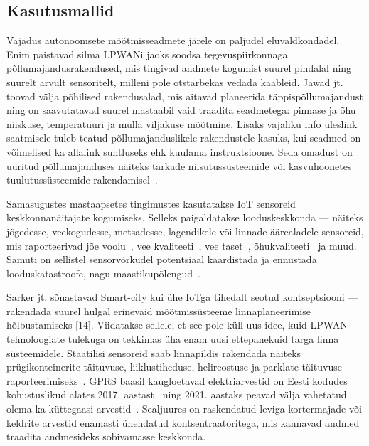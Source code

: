 \documentclass[12pt]{article}
\begin{document}
\subsection{Kasutusmallid}

Vajadus autonoomsete mõõtmisseadmete järele on paljudel eluvaldkondadel. Enim paistavad silma LPWANi jaoks soodsa tegevuspiirkonnaga põllumajandusrakendused, mis tingivad andmete kogumist suurel pindalal ning suurelt arvult sensoritelt, milleni pole otstarbekas vedada kaableid.
Jawad jt.~\cite{jawad2017energy} toovad välja põhilised rakendusalad, mis aitavad planeerida täppispõllumajandust ning on saavutatavad suurel mastaabil vaid traadita seadmetega: pinnase ja õhu niiskuse, temperatuuri ja mulla viljakuse mõõtmine.
Lisaks vajaliku info üleslink saatmisele tuleb teatud põllumajanduslikele rakendustele kasuks, kui seadmed on võimelised ka allalink suhtluseks ehk kuulama instruktsioone.
Seda omadust on uuritud põllumajanduses näiteks tarkade niisutussüsteemide või kasvuhoonetes tuulutussüsteemide rakendamisel~\cite{abba2019design}.

Samasugustes mastaapsetes tingimustes kasutatakse IoT sensoreid keskkonnanäitajate kogumiseks.
Selleks paigaldatakse looduskeskkonda — näiteks jõgedesse, veekogudesse, metsadesse, lagendikele või linnade äärealadele sensoreid, mis raporteerivad jõe voolu~\cite{guibene2017evaluation}, vee kvaliteeti~\cite{liu2018solar}, vee taset~\cite{moreno2019rivercore}, õhukvaliteeti~\cite{knoll2018low} ja muud.
Samuti on sellistel sensorvõrkudel potentsiaal kaardistada ja ennustada looduskatastroofe, nagu  maastikupõlengud~\cite{kang}.

Sarker jt. sõnastavad Smart-city kui ühe IoTga tihedalt seotud kontseptsiooni — rakendada suurel hulgal erinevaid mõõtmissüsteeme linnaplaneerimise hõlbustamiseks [14].
Viidatakse sellele, et see pole küll uus idee, kuid LPWAN tehnoloogiate tulekuga on tekkimas üha enam uusi ettepanekuid targa linna süsteemidele.
Staatilisi sensoreid saab linnapildis rakendada näiteks prügikonteinerite täituvuse, liiklustiheduse, helireostuse ja parklate täituvuse raporteerimiseks~\cite{zanella}.
GPRS baasil kaugloetavad elektriarvestid on Eesti kodudes kohustuslikud alates 2017. aastast~\cite{laurit} ning 2021. aastaks peavad välja vahetatud olema ka küttegaasi arvestid~\cite{gaas}.
Sealjuures on raskendatud leviga kortermajade või keldrite arvestid enamasti ühendatud kontsentraatoritega, mis kannavad andmed traadita andmesideks sobivamasse keskkonda.
\end{document}

